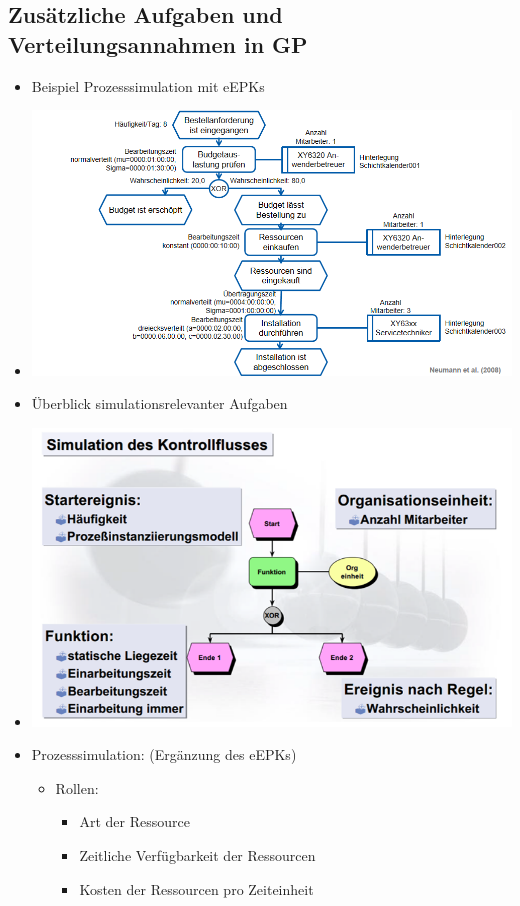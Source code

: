\documentclass[11pt,a4paper]{article}
\begin{document}
\subsection{Zusätzliche Aufgaben und Verteilungsannahmen in GP}
\begin{itemize}
\item  Beispiel Prozesssimulation mit eEPKs
\item[] \includegraphics[width=15cm]{simeepk} 
\item Überblick simulationsrelevanter Aufgaben
\item[] \includegraphics[width=15cm]{simaufgaben} 
\item Prozesssimulation: (Ergänzung des eEPKs)
	\begin{itemize}
	\item Rollen:
		\begin{itemize}
		\item Art der Ressource 
		\item Zeitliche Verfügbarkeit der Ressourcen
		\item Kosten der Ressourcen pro Zeiteinheit

\end{itemize}
\end{itemize}
\end{itemize}
\end{document}
